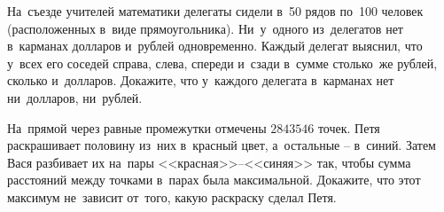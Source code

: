 \begin{problems}
\item
На~съезде учителей математики делегаты сидели в~50 рядов по~100 человек
(расположенных в~виде прямоугольника).
Ни~у~одного из~делегатов нет в~карманах долларов и~рублей одновременно.
Каждый делегат выяснил, что у~всех его соседей справа, слева, спереди и~сзади
в~сумме столько~же рублей, сколько и~долларов.
Докажите, что у~каждого делегата в~карманах нет ни~долларов, ни~рублей.

\item
На~прямой через равные промежутки отмечены $2843546$ точек.
Петя раскрашивает половину из~них в~красный цвет, а~остальные – в~синий.
Затем Вася разбивает их на~пары <<красная>>--<<синяя>> так, чтобы сумма
расстояний между точками в~парах была максимальной.
Докажите, что этот максимум не~зависит от~того, какую раскраску сделал Петя.

\end{problems}

